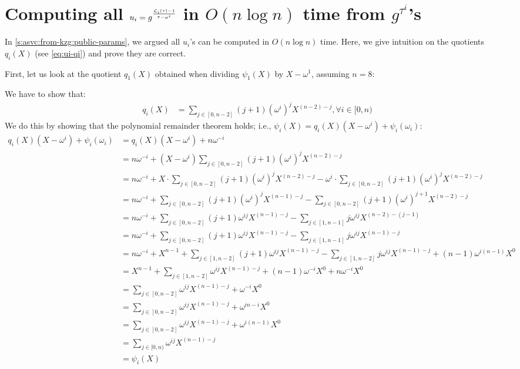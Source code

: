 \section{Computing all $u_i=g^\frac{\mathcal{L}_i(\tau) - 1}{\tau - \omega^i}$ in $O(n\log{n})$ time from $g^{\tau^i}$'s}
\label{s:computing-all-uis}

In \cref{s:asvc:from-kzg:public-params}, we argued all $u_i$'s can be computed in $O(n\log{n})$ time.
Here, we give intuition on the quotients $q_i(X)$ (see \cref{eq:ui-qi}) and prove they are correct.

First, let us look at the quotient $q_1(X)$ obtained when dividing $\psi_1(X)$ by $X-\omega^1$, assuming $n=8$:
\\


We have to show that:
\begin{align}
    q_i(X) &= \sum_{j\in [0,n-2]} (j+1)(\omega^i)^j X^{(n - 2) - j},\forall i \in [0,n)
\end{align}
We do this by showing that the polynomial remainder theorem holds;
i.e., $\psi_i(X) = q_i(X)(X-\omega^i) + \psi_i(\omega_i)$:
{
\allowdisplaybreaks %
\begin{align}
q_i(X)(X-\omega^i) + \psi_i(\omega_i)
    &= q_i(X)(X-\omega^i) + n\omega^{-i}\\
    &= n\omega^{-i} + (X-\omega^i)\sum_{j\in [0,n-2]} (j+1)(\omega^i)^j X^{(n - 2) - j}\\
    &= n\omega^{-i} + X\cdot\sum_{j\in [0,n-2]} (j+1)(\omega^i)^j X^{(n - 2) - j} - \omega^i\cdot \sum_{j\in [0,n-2]} (j+1)(\omega^i)^j X^{(n - 2) - j}\\
    &= n\omega^{-i} + \sum_{j\in [0,n-2]} (j+1)(\omega^i)^j X^{(n - 1) - j} - \sum_{j\in [0,n-2]} (j+1)(\omega^i)^{j+1} X^{(n - 2) - j}\\
    &= n\omega^{-i} + \sum_{j\in [0,n-2]} (j+1)\omega^{ij} X^{(n - 1) - j} - \sum_{j\in [1,n-1]} j \omega^{ij} X^{(n - 2) - (j-1)}\\
    &= n\omega^{-i} + \sum_{j\in [0,n-2]} (j+1)\omega^{ij} X^{(n - 1) - j} - \sum_{j\in [1,n-1]} j \omega^{ij} X^{(n - 1) - j}\\
    &= n\omega^{-i} + X^{n - 1} + \sum_{j\in [1,n-2]} (j+1)\omega^{ij} X^{(n - 1) - j} - \sum_{j\in [1,n-2]} j \omega^{ij} X^{(n - 1) - j} + (n-1) \omega^{i(n-1)} X^0\\
    &= X^{n - 1} + \sum_{j\in [1,n-2]} \omega^{ij} X^{(n - 1) - j} + (n-1) \omega^{-i} X^0 +  n\omega^{-i} X^0\\
    &= \sum_{j\in [0,n-2]} \omega^{ij} X^{(n - 1) - j} + \omega^{-i} X^0\\
    &= \sum_{j\in [0,n-2]} \omega^{ij} X^{(n - 1) - j} + \omega^{in-i} X^0\\
    &= \sum_{j\in [0,n-2]} \omega^{ij} X^{(n - 1) - j} + \omega^{i(n-1)} X^0\\
    &= \sum_{j\in [0,n)} \omega^{ij} X^{(n - 1) - j}\\
    &= \psi_i(X)
\end{align}
}